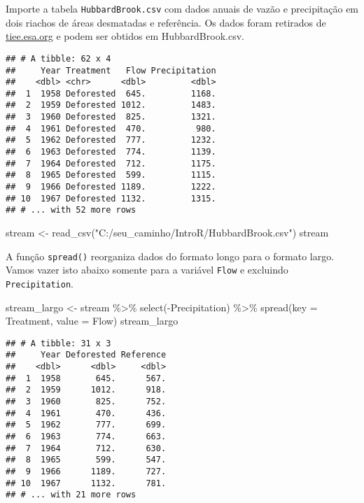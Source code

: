 \documentclass[
]{book}
\newenvironment{Shaded}{\begin{snugshade}}{\end{snugshade}}
\newcommand{\AttributeTok}[1]{\textcolor[rgb]{0.77,0.63,0.00}{#1}}
\newcommand{\FunctionTok}[1]{\textcolor[rgb]{0.00,0.00,0.00}{#1}}
\newcommand{\NormalTok}[1]{#1}
\newcommand{\OtherTok}[1]{\textcolor[rgb]{0.56,0.35,0.01}{#1}}
\newcommand{\SpecialCharTok}[1]{\textcolor[rgb]{0.00,0.00,0.00}{#1}}
\newcommand{\StringTok}[1]{\textcolor[rgb]{0.31,0.60,0.02}{#1}}
\begin{document}
Importe a tabela \texttt{HubbardBrook.csv} com dados anuais de vazão e precipitação em dois riachos de áreas desmatadas e referência. Os dados foram retirados de \href{https://tiee.esa.org/vol/v1/data_sets/hubbard/hubbard_overview.html}{tiee.esa.org} e podem ser obtidos em HubbardBrook.csv.

\begin{verbatim}
## # A tibble: 62 x 4
##     Year Treatment   Flow Precipitation
##    <dbl> <chr>      <dbl>         <dbl>
##  1  1958 Deforested  645.         1168.
##  2  1959 Deforested 1012.         1483.
##  3  1960 Deforested  825.         1321.
##  4  1961 Deforested  470.          980.
##  5  1962 Deforested  777.         1232.
##  6  1963 Deforested  774.         1139.
##  7  1964 Deforested  712.         1175.
##  8  1965 Deforested  599.         1115.
##  9  1966 Deforested 1189.         1222.
## 10  1967 Deforested 1132.         1315.
## # ... with 52 more rows
\end{verbatim}

\begin{Shaded}
\begin{Highlighting}[]
\NormalTok{stream }\OtherTok{\textless{}{-}} \FunctionTok{read\_csv}\NormalTok{(}\StringTok{"C:/seu\_caminho/IntroR/HubbardBrook.csv"}\NormalTok{)}
\NormalTok{stream}
\end{Highlighting}
\end{Shaded}

A função \texttt{spread()} reorganiza dados do formato longo para o formato largo. Vamos vazer isto abaixo somente para a variável \texttt{Flow} e excluindo \texttt{Precipitation}.

\begin{Shaded}
\begin{Highlighting}[]
\NormalTok{stream\_largo }\OtherTok{\textless{}{-}}\NormalTok{ stream }\SpecialCharTok{\%\textgreater{}\%} 
  \FunctionTok{select}\NormalTok{(}\SpecialCharTok{{-}}\NormalTok{Precipitation) }\SpecialCharTok{\%\textgreater{}\%} 
  \FunctionTok{spread}\NormalTok{(}\AttributeTok{key =}\NormalTok{ Treatment, }\AttributeTok{value =}\NormalTok{ Flow)}
\NormalTok{stream\_largo}
\end{Highlighting}
\end{Shaded}

\begin{verbatim}
## # A tibble: 31 x 3
##     Year Deforested Reference
##    <dbl>      <dbl>     <dbl>
##  1  1958       645.      567.
##  2  1959      1012.      918.
##  3  1960       825.      752.
##  4  1961       470.      436.
##  5  1962       777.      699.
##  6  1963       774.      663.
##  7  1964       712.      630.
##  8  1965       599.      547.
##  9  1966      1189.      727.
## 10  1967      1132.      781.
## # ... with 21 more rows
\end{verbatim}
\end{document}
